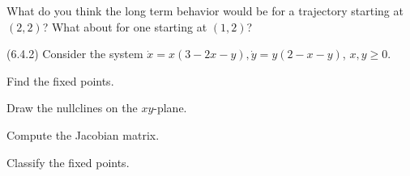 \documentclass[12pt,letterpaper,noanswers]{exam}
\begin{document}
\begin{questions}
\begin{parts}
  What do you think the long term behavior would be for a trajectory starting at $(2,2)$?  What about for one starting at $(1,2)$?

 \end{parts}
 
\item (6.4.2) Consider the system $\dot x = x(3-2x-y), \dot y = y(2-x-y)$, $x,y\geq 0$.
\begin{parts}
\item Find the fixed points.
\item Draw the nullclines on the $xy$-plane.
\item Compute the Jacobian matrix.
\item Classify the fixed points.
\end{parts}

\end{questions}

\eject


\end{document}
